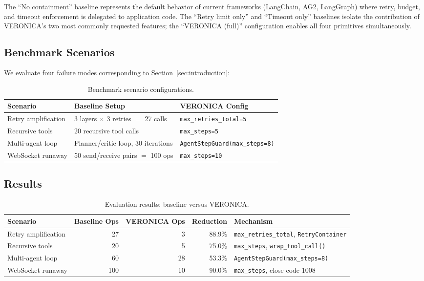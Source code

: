\documentclass[11pt]{article}
\begin{document}
The ``No containment'' baseline represents the default behavior of current
frameworks (LangChain, AG2, LangGraph) where retry, budget, and timeout
enforcement is delegated to application code. The ``Retry limit only'' and
``Timeout only'' baselines isolate the contribution of VERONICA's two most
commonly requested features; the ``VERONICA (full)'' configuration enables
all four primitives simultaneously.

\subsection{Benchmark Scenarios}

We evaluate four failure modes corresponding to Section~\ref{sec:introduction}:

\begin{table}[!ht]
\centering
\caption{Benchmark scenario configurations.}
\label{tab:scenarios}
\begin{tabular}{@{}lll@{}}
\toprule
\textbf{Scenario} & \textbf{Baseline Setup} & \textbf{VERONICA Config} \\
\midrule
Retry amplification & 3 layers $\times$ 3 retries $=$ 27 calls &
\texttt{max\_retries\_total=5} \\
Recursive tools & 20 recursive tool calls &
\texttt{max\_steps=5} \\
Multi-agent loop & Planner/critic loop, 30 iterations &
\texttt{AgentStepGuard(max\_steps=8)} \\
WebSocket runaway & 50 send/receive pairs $=$ 100 ops &
\texttt{max\_steps=10} \\
\bottomrule
\end{tabular}
\end{table}

\subsection{Results}

\begin{table}[!ht]
\centering
\caption{Evaluation results: baseline versus VERONICA.}
\label{tab:results}
\begin{tabular}{@{}lrrrl@{}}
\toprule
\textbf{Scenario} & \textbf{Baseline Ops} & \textbf{VERONICA Ops} &
\textbf{Reduction} & \textbf{Mechanism} \\
\midrule
Retry amplification & 27 & 3 & 88.9\% &
\texttt{max\_retries\_total}, \texttt{RetryContainer} \\
Recursive tools & 20 & 5 & 75.0\% &
\texttt{max\_steps}, \texttt{wrap\_tool\_call()} \\
Multi-agent loop & 60 & 28 & 53.3\% &
\texttt{AgentStepGuard(max\_steps=8)} \\
WebSocket runaway & 100 & 10 & 90.0\% &
\texttt{max\_steps}, close code 1008 \\
\bottomrule
\end{tabular}
\end{table}
\end{document}
